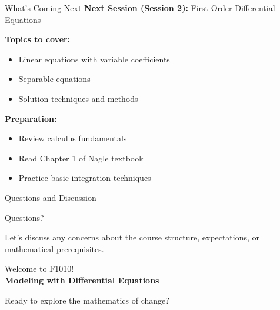 \documentclass[10pt,aspectratio=169]{beamer}
\begin{document}
\begin{frame}{What's Coming Next}
    \textbf{Next Session (Session 2):} First-Order Differential Equations
    
    \textbf{Topics to cover:}
    \begin{itemize}
        \item Linear equations with variable coefficients
        \item Separable equations
        \item Solution techniques and methods
    \end{itemize}
    
    \textbf{Preparation:}
    \begin{itemize}
        \item Review calculus fundamentals
        \item Read Chapter 1 of Nagle textbook
        \item Practice basic integration techniques
    \end{itemize}
\end{frame}

\begin{frame}{Questions and Discussion}
    \begin{center}
        \Huge Questions?
        
        \vspace{1cm}
        
        \large Let's discuss any concerns about the course structure, expectations, or mathematical prerequisites.
    \end{center}
\end{frame}

\begin{frame}[standout]
    Welcome to F1010!\\
    \textbf{Modeling with Differential Equations}
    
    \vspace{1cm}
    
    Ready to explore the mathematics of change?
\end{frame}
\end{document}
